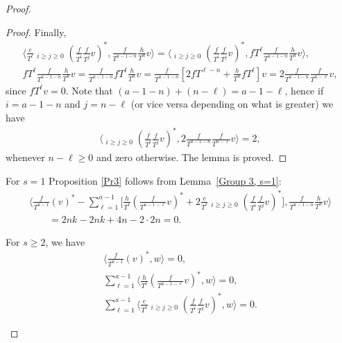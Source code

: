 \begin{proof}
\begin{proof}
Finally,
\begin{gather*}
\bigg\langle \frac{e}{T^{\ell}} \mathop{\sum_{i+j=a-1-\ell}}_{i\geq j\geq 0} \left(\frac{f}{T^i}\frac{f}{T^j}v\right)^*, \frac{f}{T^{a-1-n}}\frac{h}{T^n} v \bigg\rangle = \bigg\langle \mathop{\sum_{i+j=a-1-\ell}}_{i\geq j\geq 0} \left(\frac{f}{T^i}\frac{f}{T^j}v\right)^*, fT^{\ell} \frac{f}{T^{a-1-n}}\frac{h}{T^n} v \bigg\rangle, \\
fT^{\ell} \frac{f}{T^{a-1-n}}\frac{h}{T^n} v = \frac{f}{T^{a-1-n}} fT^{\ell} \frac{h}{T^n} v = \frac{f}{T^{a-1-n}} \left[ 2fT^{\ell-n} + \frac{h}{T^n} fT^{\ell} \right] v = 2 \frac{f}{T^{a-1-n}} \frac{f}{T^{n-\ell}} v,
\end{gather*}
since $ fT^{\ell} v = 0$. Note that $(a-1-n)+(n-\ell)=a-1-\ell$, hence if $i = a-1-n$ and $j = n-\ell$ (or vice versa depending on what is greater) we have
\begin{gather*}
\bigg\langle \mathop{\sum_{i+j=a-1-\ell}}_{i\geq j\geq 0} \left(\frac{f}{T^i}\frac{f}{T^j}v\right)^*, 2 \frac{f}{T^{a-1-n}} \frac{f}{T^{n-\ell}} v \bigg\rangle = 2,
\end{gather*}
whenever $n-\ell \geq 0$ and zero otherwise. The lemma is proved.
\end{proof}

For $s=1$ Proposition \ref{Pr3} follows from Lemma~\ref{Group 3, s=1}:
\begin{gather*}
\bigg\langle \frac{f}{T^{a-1}} (v)^* - \sum_{\ell=1}^{a-1} \bigg[\frac{h}{T^{\ell}}\left(\frac{f}{T^{a-1-\ell}}v\right)^* + 2\frac{e}{T^{\ell}} \mathop{\sum_{i+j=a-1-\ell}}_{i\geq j\geq 0} \left(\frac{f}{T^i}\frac{f}{T^j}v\right)^*\bigg], \frac{f}{T^{a-1-n}}\frac{h}{T^n} v \bigg\rangle \\
\qquad = 2nk - 2nk + 4n - 2 \cdot 2n = 0.
\end{gather*}

\begin{lem}\label{lem G1s}
For $s \geq 2$, we have
\begin{gather}
\bigg\langle \frac{f}{T^{a-1}}(v) ^*, w \bigg\rangle =0, \label{G1sg1} \\
\sum_{\ell=1}^{a-1} \bigg\langle \frac{h}{T^{\ell}} \left(\frac{f}{T^{a-1-\ell}}v\right)^*, w \bigg\rangle =0, \label{G1sg2} \\
\sum_{\ell=1}^{a-1} \bigg\langle \frac{e}{T^{\ell}} \mathop{\sum_{i+j=a-1-\ell}}_{i\geq j\geq 0} \left(\frac{f}{T^i}\frac{f}{T^j}v\right)^*, w \bigg\rangle = 0. \label{G1sg3}
\end{gather}
\end{lem}


\end{proof}
